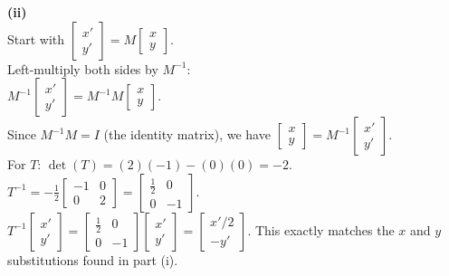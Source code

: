 \begin{solution}
\medskip
\textbf{(ii)} \\
Start with $\begin{bmatrix} x' \\ y' \end{bmatrix} = M \begin{bmatrix} x \\ y \end{bmatrix}$. \\
Left-multiply both sides by $M^{-1}$: \\
$M^{-1} \begin{bmatrix} x' \\ y' \end{bmatrix} = M^{-1}M \begin{bmatrix} x \\ y \end{bmatrix}$. \\
Since $M^{-1}M = I$ (the identity matrix), we have $\begin{bmatrix} x \\ y \end{bmatrix} = M^{-1} \begin{bmatrix} x' \\ y' \end{bmatrix}$. \\
For $T$: $\det(T) = (2)(-1) - (0)(0) = -2$. \\
$T^{-1} = -\frac{1}{2} \begin{bmatrix} -1 & 0 \\ 0 & 2 \end{bmatrix} = \begin{bmatrix} \frac{1}{2} & 0 \\ 0 & -1 \end{bmatrix}$. \\
$T^{-1} \begin{bmatrix} x' \\ y' \end{bmatrix} = \begin{bmatrix} \frac{1}{2} & 0 \\ 0 & -1 \end{bmatrix} \begin{bmatrix} x' \\ y' \end{bmatrix} = \begin{bmatrix} x'/2 \\ -y' \end{bmatrix}$. This exactly matches the $x$ and $y$ substitutions found in part (i).


\end{solution}
